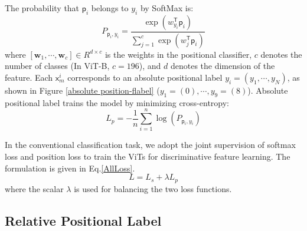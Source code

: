 \documentclass{article}
\begin{document}
The probability that ${{\mathsf{p}}_{i}}$ belongs to ${{{y}}_{i}}$ by SoftMax is:
\begin{equation}
{{P}_{{{\mathsf{p}}_{i}},{{y}_{i}}}}=\frac{\exp (w_{{{y}_{i}}}^{\mathsf{T}}{{\mathsf{p}}_{i}})}{\sum\limits_{j=1}^{c}{\exp (w_{j}^{\mathsf{T}}{{\mathsf{p}}_{i}})}}
  \label{SoftMaxprobability}
\end{equation}
where $[{{\boldsymbol{w}}_{1}},\cdots ,{{\boldsymbol{w}}_{c}}]\in {{R}^{d\times c}}$ is the weights in the positional classiﬁer, $c$ denotes the number of classes (In ViT-B, $c=196$), and $d$ denotes the dimension of the feature. Each $\mathsf{x}_{m}^{i}$ corresponds to an absolute positional label ${{{y}}_{i}}=\left( {{{y}}_{1}},\cdots ,{{{y}}_{N}} \right)$, as shown in Figure \ref{absolute position-flabel} (${{{y}}_{1}}=\left( 0 \right),\cdots ,{{{y}}_{9}}=\left( 8 \right)$). Absolute positional label trains the model by minimizing cross-entropy:
\begin{equation}
{{L}_{p}}=-\frac{1}{n}\sum\limits_{i=1}^{n}{\log \left( {{P}_{{{\mathsf{p}}_{i}},{{y}_{i}}}} \right)}
\end{equation}

In the conventional classification task, we adopt the joint supervision of softmax loss and position loss to train the ViTs for discriminative feature learning. The formulation is given in Eq.\ref{AllLoss}.
\begin{equation}
L={{L}_{s}}+\lambda {{L}_{p}} 
 \label{AllLoss}
\end{equation}
where the scalar $\lambda$ is used for balancing the two loss functions.

\subsection{Relative Positional Label}
\end{document}
